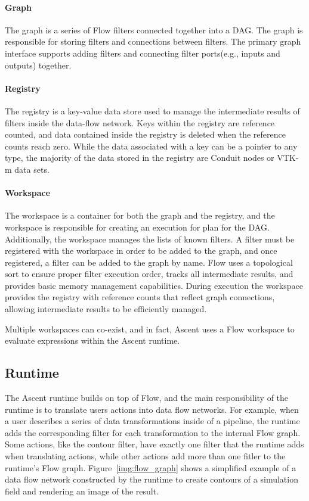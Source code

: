 \paragraph{Graph}
The graph is a series of Flow filters connected together into
a DAG.
%
The graph is responsible for storing filters and connections
between filters.
%
The primary graph interface supports adding filters and connecting
filter ports(e.g., inputs and outputs) together.

\paragraph{Registry}
The registry is a key-value data store used to manage the intermediate
results of filters inside the data-flow network.
%
Keys within the registry are reference counted, and data contained
inside the registry is deleted when the reference counts reach zero.
%
While the data associated with a key can be a pointer to any type,
the majority of the data stored in the registry are Conduit nodes
or VTK-m data sets.


\paragraph{Workspace}
The workspace is a container for both the graph and the registry,
and the workspace is responsible for creating an execution for plan
for the DAG.
%
Additionally, the workspace manages the lists of known filters.
%
A filter must be registered with the workspace in order to be added to the
graph, and once registered, a filter can be added to the graph by name.
%
Flow uses a topological sort to ensure proper filter execution order,
tracks all intermediate results, and provides basic memory management capabilities.
During execution the workspace provides the registry with reference counts that reflect graph connections, allowing intermediate results to be efficiently managed.

%
Multiple workspaces can co-exist, and in fact, Ascent uses a Flow workspace
to evaluate expressions within the Ascent runtime.
%

\subsection{Runtime}
The Ascent runtime builds on top of Flow, and the main responsibility of the
runtime is to translate users actions into data flow networks.
%
For example, when a user describes a series of data transformations inside of a pipeline,
the runtime adds the corresponding filter for each transformation to
the internal Flow graph.
%
Some actions, like the contour filter, have exactly one filter that the runtime
adds when translating actions, while other actions add more than one fitler to the runtime's
Flow graph.
%
Figure~\ref{img:flow_graph} shows a simplified example of a data flow network constructed by the
runtime to create contours of a simulation field and rendering an image of the result.
%

